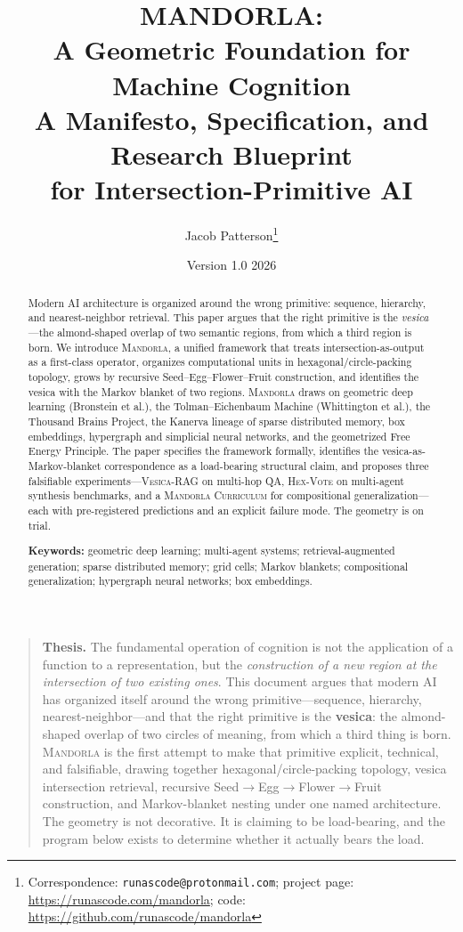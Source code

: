 \documentclass[11pt,a4paper]{article}
\title{
  \textbf{MANDORLA:}\\
  A Geometric Foundation for Machine Cognition\\
  \vspace{0.3em}
  \large A Manifesto, Specification, and Research Blueprint\\
  for Intersection-Primitive AI
}
\author[1]{Jacob Patterson\thanks{Correspondence: \texttt{runascode@protonmail.com}; project page: \url{https://runascode.com/mandorla}; code: \url{https://github.com/runascode/mandorla}}}
\affil[1]{Independent Researcher}
\date{Version 1.0 \textemdash{} 2026}
\begin{document}
\maketitle

\begin{abstract}
\noindent
Modern AI architecture is organized around the wrong primitive: sequence, hierarchy, and nearest-neighbor retrieval. This paper argues that the right primitive is the \emph{vesica}---the almond-shaped overlap of two semantic regions, from which a third region is born. We introduce \textsc{Mandorla}, a unified framework that treats intersection-as-output as a first-class operator, organizes computational units in hexagonal/circle-packing topology, grows by recursive Seed--Egg--Flower--Fruit construction, and identifies the vesica with the Markov blanket of two regions. \textsc{Mandorla} draws on geometric deep learning (Bronstein et al.), the Tolman--Eichenbaum Machine (Whittington et al.), the Thousand Brains Project, the Kanerva lineage of sparse distributed memory, box embeddings, hypergraph and simplicial neural networks, and the geometrized Free Energy Principle. The paper specifies the framework formally, identifies the vesica-as-Markov-blanket correspondence as a load-bearing structural claim, and proposes three falsifiable experiments---\textsc{Vesica-RAG} on multi-hop QA, \textsc{Hex-Vote} on multi-agent synthesis benchmarks, and a \textsc{Mandorla Curriculum} for compositional generalization---each with pre-registered predictions and an explicit failure mode. The geometry is on trial.

\vspace{0.5em}
\noindent\textbf{Keywords:} geometric deep learning; multi-agent systems; retrieval-augmented generation; sparse distributed memory; grid cells; Markov blankets; compositional generalization; hypergraph neural networks; box embeddings.
\end{abstract}

\tableofcontents
\newpage

\begin{quote}
\textbf{Thesis.} The fundamental operation of cognition is not the application of a function to a representation, but the \emph{construction of a new region at the intersection of two existing ones}. This document argues that modern AI has organized itself around the wrong primitive---sequence, hierarchy, nearest-neighbor---and that the right primitive is the \textbf{vesica}: the almond-shaped overlap of two circles of meaning, from which a third thing is born. \textsc{Mandorla} is the first attempt to make that primitive explicit, technical, and falsifiable, drawing together hexagonal/circle-packing topology, vesica intersection retrieval, recursive Seed$\rightarrow$Egg$\rightarrow$Flower$\rightarrow$Fruit construction, and Markov-blanket nesting under one named architecture. The geometry is not decorative. It is claiming to be load-bearing, and the program below exists to determine whether it actually bears the load.
\end{quote}
\end{document}
